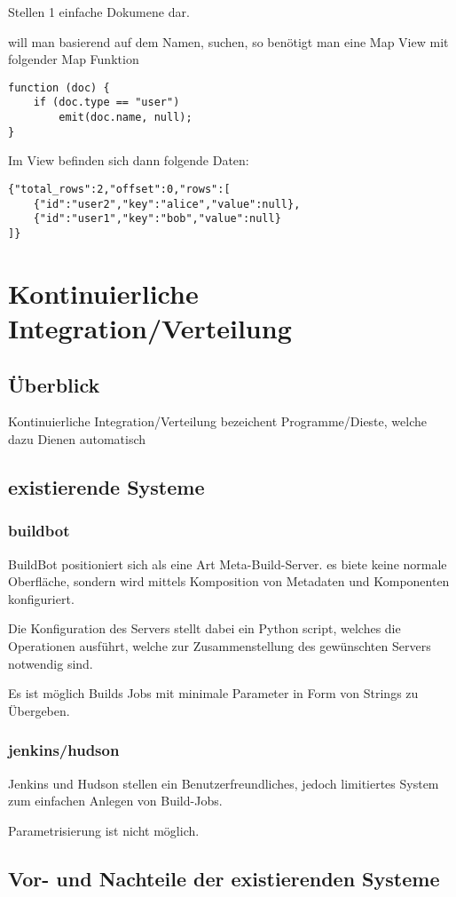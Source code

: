 Stellen 1 einfache Dokumene dar.

will man basierend auf dem Namen, suchen, so benötigt man eine Map View mit folgender Map Funktion
\begin{lstlisting}
function (doc) {
    if (doc.type == "user")
        emit(doc.name, null);
}
\end{lstlisting}

Im View befinden sich dann folgende Daten:

\begin{lstlisting}
{"total_rows":2,"offset":0,"rows":[
    {"id":"user2","key":"alice","value":null},
    {"id":"user1","key":"bob","value":null}
]}
\end{lstlisting}



\section{Kontinuierliche Integration/Verteilung}

\subsection{Überblick}

Kontinuierliche Integration/Verteilung bezeichent Programme/Dieste,
welche dazu Dienen automatisch 

\subsection{existierende Systeme}

\subsubsection{buildbot}

BuildBot positioniert sich als eine Art Meta-Build-Server.
es biete keine normale Oberfläche, sondern wird mittels
Komposition von Metadaten und Komponenten konfiguriert.

Die Konfiguration des Servers stellt dabei ein Python script,
welches die Operationen ausführt, welche zur Zusammenstellung des gewünschten Servers notwendig sind.

Es ist möglich Builds Jobs mit minimale Parameter in Form von Strings zu Übergeben.

\subsubsection{jenkins/hudson}

Jenkins und Hudson stellen ein Benutzerfreundliches,
jedoch limitiertes System zum einfachen Anlegen von Build-Jobs.

Parametrisierung ist nicht möglich.

\subsection{Vor- und Nachteile der existierenden Systeme}
